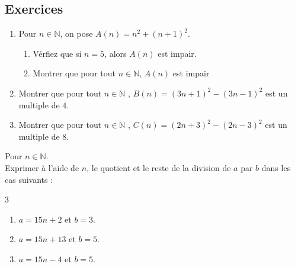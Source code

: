 
\newpage 
{}  
\pagestyle{scrheadings} %
\onehalfspacing


\subsection{Exercices}
\begin{exercise}\hfill 
	\begin{enumerate}[label={\arabic*)}, leftmargin=*]  
		\item  Pour $n\in\mathbb{N}$, on pose $A(n)=n^2+(n+1)^2$.
		\begin{enumerate}[label={\alph*)}, leftmargin=*]  
			\item Vérfiez que si $n=5$, alors $A(n)$ est impair.
			\item Montrer que pour tout $n\in\mathbb{N}$, $A(n)$ est impair
		\end{enumerate} 
		\item Montrer que pour tout $n\in\mathbb{N}$ , $B(n)=(3n+1)^2-(3n-1)^2$ est un multiple de $4$.
		\item Montrer que pour tout $n\in\mathbb{N}$ , $C(n)=(2n+3)^2-(2n-3)^2$ est un multiple de $8$.
	\end{enumerate}
\end{exercise}
\begin{example} Pour $n\in\mathbb{N}$. \\
	Exprimer à l'aide de $n$, le quotient et le reste de la division de $a$ par $b$ dans les cas suivants :
	\begin{multicols}{3}
		\begin{enumerate}[label={\arabic*)}, leftmargin=*]  
			\item$a=15n+2$ et $b=3$.
			\item$a=15n+13$ et $b=5$.
			\item$a=15n-4$ et $b=5$.
		\end{enumerate} 
	\end{multicols}
	\vspace{2cm} 
\end{example}
